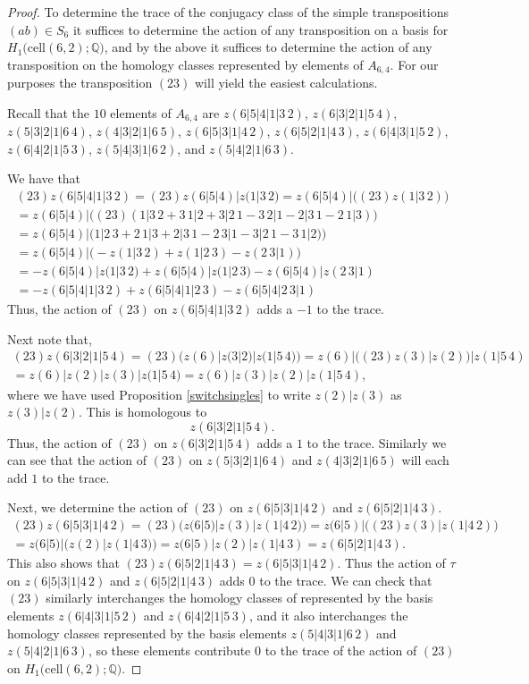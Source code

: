 \documentclass[12py]{amsart}%
\theoremstyle{definition}\newtheorem{definition}[thm]{Definition}
\theoremstyle{definition}
\newcommand{\Q}{\ensuremath{\mathbb{Q}}}
\begin{document}
\begin{proof}
To determine the trace of the conjugacy class of the simple transpositions $(ab)\in S_{6}$ it suffices to determine the action of any transposition on a basis for $H_{1}\big(\text{cell}(6,2);\Q\big)$, and by the above it suffices to determine the action of any transposition on the homology classes represented by elements of $A_{6,4}$. For our purposes the transposition $(23)$ will yield the easiest calculations. 

Recall that the $10$ elements of $A_{6,4}$ are $z(6|5|4|1|3\,2)$, $z(6|3|2|1|5\,4)$, $z(5|3|2|1|6\,4)$, $z(4|3|2|1|6\:5)$, $z(6|5|3|1|4\,2)$, $z(6|5|2|1|4\,3)$, $z(6|4|3|1|5\,2)$, $z(6|4|2|1|5\,3)$, $z(5|4|3|1|6\,2)$, and $z(5|4|2|1|6\,3)$. 

We have that
\begin{align*}
(23)z(6|5|4|1|3\,2)=(23)z(6|5|4)|z(1|3\,2)=z(6|5|4)|\big((23)z(1|3\,2)\big)\\
=z(6|5|4)|\big((23)(1|3\,2+3\,1|2+3|2\,1-3\,2|1-2|3\,1-2\,1|3)\big)\\
=z(6|5|4)|\big(1|2\,3+2\,1|3+2|3\,1-2\,3|1-3|2\,1-3\,1|2)\big)\\
=z(6|5|4)|\big(-z(1|3\,2)+z(1|2\,3)-z(2\,3|1)\big)\\
=-z(6|5|4)|z(1|3\,2)+z(6|5|4)|z(1|2\,3)-z(6|5|4)|z(2\,3|1)\\
=-z(6|5|4|1|3\,2)+z(6|5|4|1|2\,3)-z(6|5|4|2\,3|1)
\end{align*}
Thus, the action of $(23)$ on $z(6|5|4|1|3\,2)$ adds a $-1$ to the trace.

Next note that,
\begin{align*}
(23)z(6|3|2|1|5\,4)=(23)\big(z(6)|z(3|2)|z(1|5\,4)\big)=z(6)|\big((23)z(3)|z(2)\big)|z(1|5\,4)\\
=z(6)|z(2)|z(3)|z(1|5\,4)=z(6)|z(3)|z(2)|z(1|5\,4),
\end{align*}
where we have used Proposition \ref{switchsingles} to write $z(2)|z(3)$ as $z(3)|z(2)$. This is homologous to
\[
z(6|3|2|1|5\,4).
\]
Thus, the action of $(23)$ on $z(6|3|2|1|5\,4)$ adds a $1$ to the trace. Similarly we can see that the action of $(23)$ on $z(5|3|2|1|6\,4)$ and $z(4|3|2|1|6\,5)$ will each add $1$ to the trace.

Next, we determine the action of $(23)$ on $z(6|5|3|1|4\,2)$ and $z(6|5|2|1|4\,3)$.
\begin{align*}
(23)z(6|5|3|1|4\,2)=(23)\big(z(6|5)|z(3)|z(1|4\,2)\big)=z(6|5)|\big((23)z(3)|z(1|4\,2)\big)\\
=z(6|5)|\big(z(2)|z(1|4\,3)\big)=z(6|5)|z(2)|z(1|4\,3)=z(6|5|2|1|4\,3).
\end{align*}
This also shows that $(23)z(6|5|2|1|4\,3)=z(6|5|3|1|4\,2)$. Thus the action of $\tau$ on $z(6|5|3|1|4\,2)$ and $z(6|5|2|1|4\,3)$ adds $0$ to the trace. We can check that $(23)$ similarly interchanges the homology classes of represented by the basis elements $z(6|4|3|1|5\,2)$ and $z(6|4|2|1|5\,3)$, and it also interchanges the homology classes represented by the basis elements $z(5|4|3|1|6\,2)$ and $z(5|4|2|1|6\,3)$, so these elements contribute $0$ to the trace of the action of $(23)$ on $H_{1}\big(\text{cell}(6,2);\Q\big)$.


\end{proof}
\end{document}
